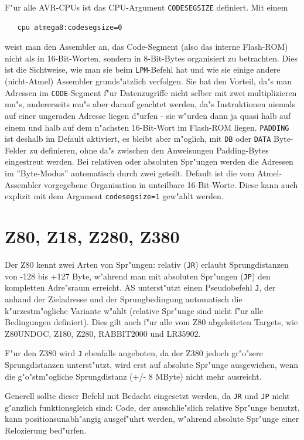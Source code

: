 \documentclass[12pt,a4paper,twoside]{report}
\newcommand{\asname}{AS}
\begin{document}
F"ur alle AVR-CPUs ist das CPU-Argument {\tt CODESEGSIZE} definiert.
Mit einem
\begin{verbatim}
   cpu atmega8:codesegsize=0
\end{verbatim}
weist man den Assembler an, das Code-Segment (also das interne Flash-ROM)
nicht als in 16-Bit-Worten, sondern in 8-Bit-Bytes organisiert zu betrachten.
Dies ist die Sichtweise, wie man sie beim {\tt LPM}-Befehl hat und wie sie
einige andere (nicht-Atmel) Assembler grunds"atzlich verfolgen.  Sie hat den
Vorteil, da"s man Adressen im {\tt CODE}-Segment f"ur Datenzugriffe nicht selber
mit zwei multiplizieren mu"s, andererseits mu"s aber darauf geachtet werden,
da"s Instruktionen niemals auf einer ungeraden Adresse liegen d"urfen - sie
w"urden dann ja quasi halb auf einem und halb auf dem n"achsten 16-Bit-Wort
im Flash-ROM liegen.  {\tt PADDING} ist deshalb im Default aktiviert, es bleibt
aber m"oglich, mit {\tt DB} oder {\tt DATA} Byte-Felder zu definieren, ohne
da"s zwischen den Anweisungen Padding-Bytes eingestreut werden.  Bei relativen
oder absoluten Spr"ungen werden die Adressen im ''Byte-Modus'' automatisch
durch zwei geteilt.  Default ist die vom Atmel-Assembler vorgegebene Organisation
in unteilbare 16-Bit-Worte.  Diese kann auch explizit mit dem Argument
\verb!codesegsize=1! gew"ahlt werden.


\section{Z80, Z18, Z280, Z380}

Der Z80 kennt zwei Arten von Spr"ungen: relativ ({\tt JR}) erlaubt Sprungdistanzen
von -128 bis +127 Byte, w"ahrend man mit absoluten Spr"ungen ({\tt JP}) den
kompletten Adre"sraum erreicht.  \asname{} unterst"utzt einen Pseudobefehl
{\tt J}, der anhand der Zieladresse und der Sprungbedingung automatisch die
k"urzestm"ogliche Variante w"ahlt (relative Spr"unge sind nicht f"ur alle
Bedingungen definiert).  Dies gilt auch f"ur alle vom Z80 abgeleiteten Targets,
wie Z80UNDOC, Z180, Z280, RABBIT2000 und LR35902.

F"ur den Z380 wird {\tt J} ebenfalls angeboten, da der Z380 jedoch gr"o"sere
Sprungdistanzen unterst"utzt, wird erst auf absolute Spr"unge ausgewichen,
wenn die g"o"stm"ogliche Sprungdistanz (+/- 8 MByte) nicht mehr ausreicht.

Generell sollte dieser Befehl mit Bedacht eingesetzt werden, da {\tt JR} und
{\tt JP} nicht g"anzlich funktionsgleich sind: Code, der ausschlie"slich
relative Spr"unge benutzt, kann positionsunabh"angig ausgef"uhrt werden,
w"ahrend absolute Spr"unge einer Relozierung bed"urfen.
\end{document}
